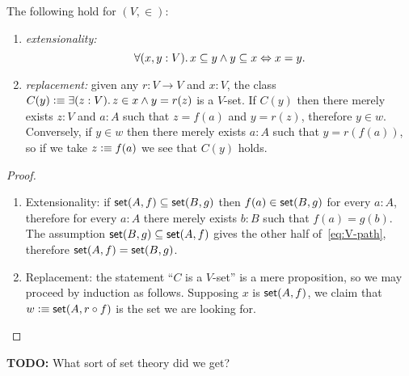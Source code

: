 \begin{thm}
  The following hold for $(V, {\in})$:
  \begin{enumerate}
  \item \emph{extensionality:}
    \begin{equation*}
      \fall{x, y : V} x \subseteq y \land y \subseteq x \Leftrightarrow x = y.
    \end{equation*}
  \item \emph{replacement:} given any $r : V \to V$ and $x : V$, the class $C(y) \defeq
    \exis{z : V} z \in x \land y = r(z)$ is a $V$-set. If $C(y)$ then there merely exists
    $z : V$ and $a : A$ such that $z = f(a)$ and $y = r(z)$, therefore $y \in w$.
    Conversely, if $y \in w$ then there merely exists $a : A$ such that $y = r(f(a))$, so
    if we take $z \vcentcolon\equiv f(a)$ we see that $C(y)$ holds.
  \end{enumerate}
\end{thm}


\begin{proof}
  \mbox{}
  \begin{enumerate}
  \item Extensionality: if $\mathsf{set}(A,f) \subseteq \mathsf{set}(B, g)$ then $f(a) \in \mathsf{set}(B, g)$
    for every $a : A$, therefore for every $a : A$ there merely exists $b : B$ such that
    $f(a) = g(b)$. The assumption $\mathsf{set}(B, g) \subseteq \mathsf{set}(A, f)$ gives the other half
    of~\eqref{eq:V-path}, therefore $\mathsf{set}(A,f) = \mathsf{set}(B,g)$.

  \item Replacement: the statement ``$C$ is a $V$-set'' is a mere proposition, so we may
    proceed by induction as follows. Supposing $x$ is $\mathsf{set}(A, f)$, we claim that $w
    \vcentcolon\equiv \mathsf{set}(A, r \circ f)$ is the set we are looking for.

  \end{enumerate}
\end{proof}

\textbf{TODO:} What sort of set theory did we get?




